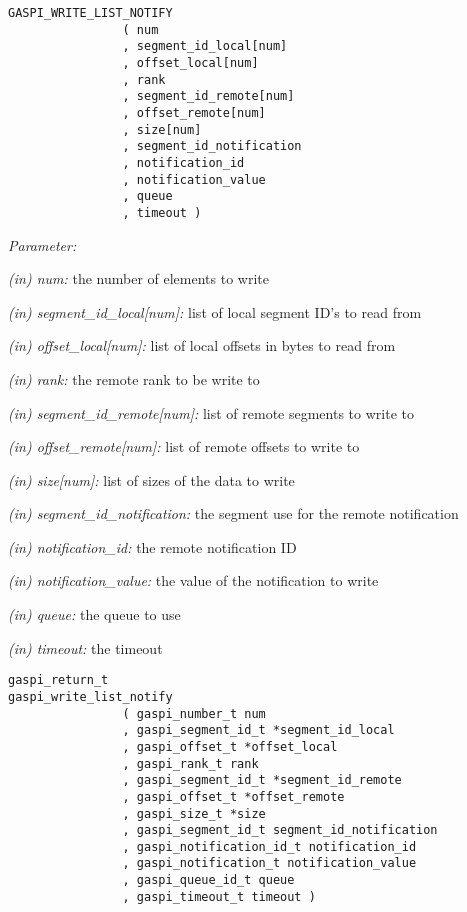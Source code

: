 \documentclass[a4paper]{article}
\newlength{\st}\setlength{\st}{0pt}
\newcommand{\parameter}[1]{{\it #1}}
\newenvironment{cbox}[1]
{\newcommand\colboxcolor{#1}\begin{lrbox}{\riddlebox}\begin{minipage}{\dimexpr\columnwidth-2\fboxsep\relax}}
{\end{minipage}\end{lrbox}\begin{center}\colorbox[HTML]{\colboxcolor}{\usebox{\riddlebox}}\end{center}}
\newcommand{\shortlistbegin}[1]{\begin{trivlist}\setlength{\itemsep}{0pt}\item[]\emph{#1:}}
\newcommand{\shortlistitem}[1]{\item[]#1}
\newcommand{\shortlistend}{\end{trivlist}}
\newenvironment{FDef}{\begin{trivlist}\item[]}{\end{trivlist}}
\newenvironment{FDefSign}{\begin{cbox}{EEEEEE}}{\end{cbox}}
\newcommand{\parameterlistbegin}{\shortlistbegin{Parameter}}
\newcommand{\parameterlistend}{\shortlistend}
\newcommand{\parameterlistitem}[3]{\shortlistitem{\parameter{(#1) #2:} {#3}}}
\begin{document}
\begin{FDef}
\begin{FDefSign}
\begin{verbatim}
GASPI_WRITE_LIST_NOTIFY
                ( num
                , segment_id_local[num]
                , offset_local[num]
                , rank
                , segment_id_remote[num]
                , offset_remote[num]
                , size[num]
                , segment_id_notification
                , notification_id
                , notification_value
                , queue
                , timeout )
\end{verbatim}
\end{FDefSign}

\parameterlistbegin
\parameterlistitem{in}{num}{the number of elements to write}
\parameterlistitem{in}{segment\_id\_local[num]}{list of local segment ID's to read from}
\parameterlistitem{in}{offset\_local[num]}{list of local offsets in bytes to read from}
\parameterlistitem{in}{rank}{the remote rank to be write to}
\parameterlistitem{in}{segment\_id\_remote[num]}{list of remote segments to write to}
\parameterlistitem{in}{offset\_remote[num]}{list of remote offsets to write to}
\parameterlistitem{in}{size[num]}{list of sizes of the data to write}
\parameterlistitem{in}{segment\_id\_notification}{the segment use for the remote notification}
\parameterlistitem{in}{notification\_id}{the remote notification ID}
\parameterlistitem{in}{notification\_value}{the value of the notification to write}
\parameterlistitem{in}{queue}{the queue to use}
\parameterlistitem{in}{timeout}{the timeout}
\parameterlistend


\begin{FDefSign}
\begin{verbatim}
gaspi_return_t
gaspi_write_list_notify
                ( gaspi_number_t num
                , gaspi_segment_id_t *segment_id_local
                , gaspi_offset_t *offset_local
                , gaspi_rank_t rank
                , gaspi_segment_id_t *segment_id_remote
                , gaspi_offset_t *offset_remote
                , gaspi_size_t *size
                , gaspi_segment_id_t segment_id_notification
                , gaspi_notification_id_t notification_id
                , gaspi_notification_t notification_value
                , gaspi_queue_id_t queue
                , gaspi_timeout_t timeout )
\end{verbatim}
\end{FDefSign}



\end{FDef}
\end{document}
